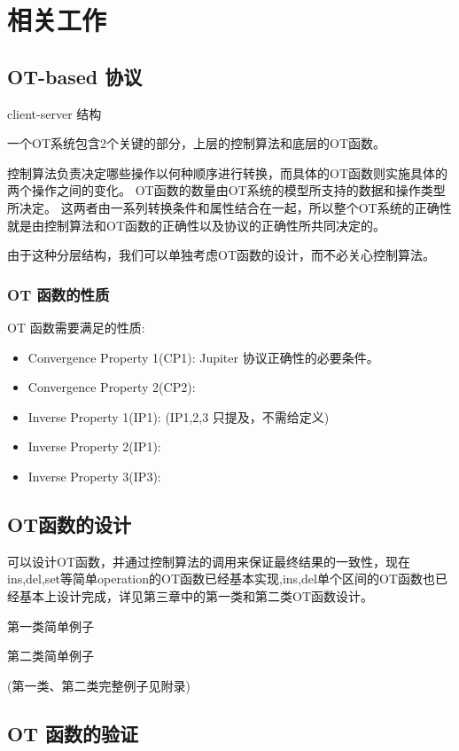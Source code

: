 \chapter{相关工作}

\section{OT-based 协议}
client-server 结构


一个OT系统包含2个关键的部分，上层的控制算法和底层的OT函数。

控制算法负责决定哪些操作以何种顺序进行转换，而具体的OT函数则实施具体的两个操作之间的变化。
OT函数的数量由OT系统的模型所支持的数据和操作类型所决定。
这两者由一系列转换条件和属性结合在一起，所以整个OT系统的正确性就是由控制算法和OT函数的正确性以及协议的正确性所共同决定的。

由于这种分层结构，我们可以单独考虑OT函数的设计，而不必关心控制算法。

\subsection{OT 函数的性质}
	OT 函数需要满足的性质:
	\begin{itemize}
	  \item Convergence Property 1(CP1): Jupiter 协议正确性的必要条件。
	  \item Convergence Property 2(CP2):
	  \item Inverse Property 1(IP1): (IP1,2,3 只提及，不需给定义)
	  \item Inverse Property 2(IP1):
	  \item Inverse Property 3(IP3):
	\end{itemize}

\section{OT函数的设计}
可以设计OT函数，并通过控制算法的调用来保证最终结果的一致性，现在ins,del,set等简单operation的OT函数已经基本实现,ins,del单个区间的OT函数也已经基本上设计完成，详见第三章中的第一类和第二类OT函数设计。
	
第一类简单例子

第二类简单例子

(第一类、第二类完整例子见附录)
\section{OT 函数的验证}

	